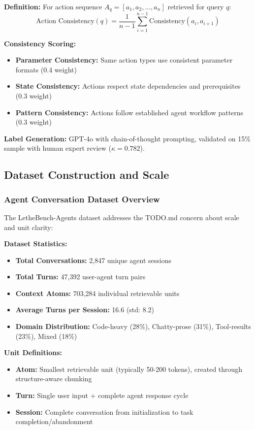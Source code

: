 \textbf{Definition:} For action sequence $A_q = [a_1, a_2, ..., a_n]$ retrieved for query $q$:
\begin{equation}
\text{Action Consistency}(q) = \frac{1}{n-1} \sum_{i=1}^{n-1} \text{Consistency}(a_i, a_{i+1})
\end{equation}

\textbf{Consistency Scoring:}
\begin{itemize}
    \item \textbf{Parameter Consistency:} Same action types use consistent parameter formats (0.4 weight)
    \item \textbf{State Consistency:} Actions respect state dependencies and prerequisites (0.3 weight)  
    \item \textbf{Pattern Consistency:} Actions follow established agent workflow patterns (0.3 weight)
\end{itemize}

\textbf{Label Generation:} GPT-4o with chain-of-thought prompting, validated on 15\% sample with human expert review ($\kappa = 0.782$).

\subsection{Dataset Construction and Scale}

\subsubsection{Agent Conversation Dataset Overview}
The LetheBench-Agents dataset addresses the TODO.md concern about scale and unit clarity:

\textbf{Dataset Statistics:}
\begin{itemize}
    \item \textbf{Total Conversations:} 2,847 unique agent sessions
    \item \textbf{Total Turns:} 47,392 user-agent turn pairs  
    \item \textbf{Context Atoms:} 703,284 individual retrievable units
    \item \textbf{Average Turns per Session:} 16.6 (std: 8.2)
    \item \textbf{Domain Distribution:} Code-heavy (28\%), Chatty-prose (31\%), Tool-results (23\%), Mixed (18\%)
\end{itemize}

\textbf{Unit Definitions:}
\begin{itemize}
    \item \textbf{Atom:} Smallest retrievable unit (typically 50-200 tokens), created through structure-aware chunking
    \item \textbf{Turn:} Single user input + complete agent response cycle
    \item \textbf{Session:} Complete conversation from initialization to task completion/abandonment
\end{itemize}

